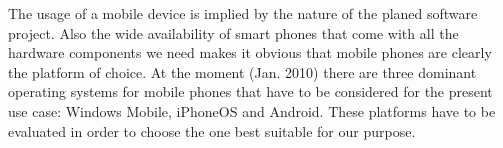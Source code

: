 The usage of a mobile device is implied by the nature of the planed software project. Also the wide availability of  smart phones that come with all the hardware components we need makes it obvious that mobile phones are clearly the platform of choice. At the moment (Jan. 2010) there are three dominant operating systems for mobile phones that have to be considered for the present use case: Windows Mobile, iPhoneOS and Android. These platforms have to be evaluated in order to choose the one best suitable for our purpose.   